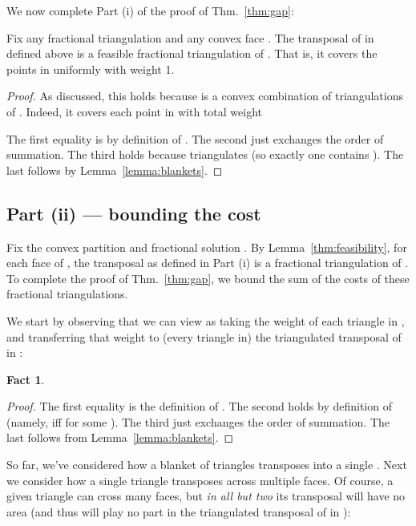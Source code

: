 \documentclass[final]{siamltex}
\newtheorem{fact}{Fact}[theorem]
\begin{document}
We now complete Part (i) of the proof of Thm.~\ref{thm:gap}:
\begin{lemma}\label{thm:feasibility}
  Fix any fractional triangulation  and any convex face .
  The transposal  of  in  
  defined above
  is a feasible fractional triangulation of .
  That is, it covers the points in  uniformly with weight 1.
\end{lemma}

\begin{proof}
As discussed, this holds because  is a convex combination
of triangulations of .
Indeed, it covers each point  in  with total weight

The first equality is by definition of .
The second just exchanges the order of summation.
The third holds because  triangulates 
(so exactly one  contains ).
The last follows by Lemma~\ref{lemma:blankets}.
\end{proof}

\subsection{Part (ii) --- bounding the cost}
Fix the convex partition  and fractional solution .
By Lemma~\ref{thm:feasibility}, for each face  of ,
the transposal  as defined in Part (i)
is a fractional triangulation of .
To complete the proof of Thm.~\ref{thm:gap},
we bound the sum of the costs of these fractional triangulations.

We start by observing that we can view 
as taking the weight of each triangle  in ,
and transferring that weight to (every triangle in) the triangulated transposal 
 of  in :
\begin{fact}\label{observation:cost}
  
\end{fact}

\begin{proof} 

The first equality is the definition of .
The second holds by definition of 
(namely, 
iff
 for some ).
The third just exchanges the order of summation.
The last follows from Lemma~\ref{lemma:blankets}.
\end{proof}

So far, we've considered how a blanket of triangles transposes into a single .
Next we consider how a single triangle  transposes across multiple faces.
Of course, a given triangle  can cross many faces,
but {\em in all but two} its transposal will have no area
(and thus will play no part in the triangulated transposal of  in ):
\end{document}
